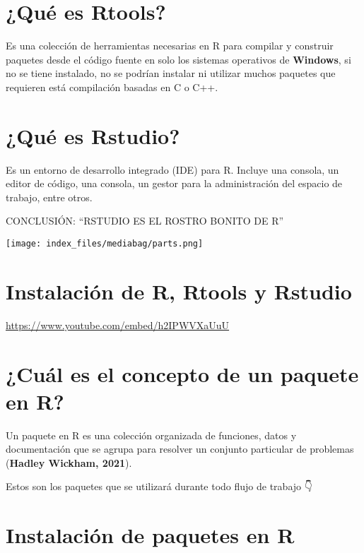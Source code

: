 \documentclass[
  letterpaper,
  DIV=11,
  numbers=noendperiod]{scrreprt}
\begin{document}
\hypertarget{quuxe9-es-rtools}{%
\section{¿Qué es Rtools?}\label{quuxe9-es-rtools}}

Es una colección de herramientas necesarias en R para compilar y
construir paquetes desde el código fuente en solo los sistemas
operativos de \textbf{Windows}, si no se tiene instalado, no se podrían
instalar ni utilizar muchos paquetes que requieren está compilación
basadas en C o C++.

\hypertarget{quuxe9-es-rstudio}{%
\section{¿Qué es Rstudio?}\label{quuxe9-es-rstudio}}

Es un entorno de desarrollo integrado (IDE) para R. Incluye una consola,
un editor de código, una consola, un gestor para la administración del
espacio de trabajo, entre otros.

CONCLUSIÓN: ``RSTUDIO ES EL ROSTRO BONITO DE R''

\texttt{[image: index\_files/mediabag/parts.png]}

\hypertarget{instalaciuxf3n-de-r-rtools-y-rstudio}{%
\section{Instalación de R, Rtools y
Rstudio}\label{instalaciuxf3n-de-r-rtools-y-rstudio}}

\url{https://www.youtube.com/embed/h2IPWVXaUuU}

\hypertarget{cuuxe1l-es-el-concepto-de-un-paquete-en-r}{%
\section{¿Cuál es el concepto de un paquete en
R?}\label{cuuxe1l-es-el-concepto-de-un-paquete-en-r}}

Un paquete en R es una colección organizada de funciones, datos y
documentación que se agrupa para resolver un conjunto particular de
problemas (\textbf{Hadley Wickham, 2021}).

Estos son los paquetes que se utilizará durante todo flujo de trabajo 👇

\hypertarget{instalaciuxf3n-de-paquetes-en-r}{%
\section{Instalación de paquetes en
R}\label{instalaciuxf3n-de-paquetes-en-r}}
\end{document}
